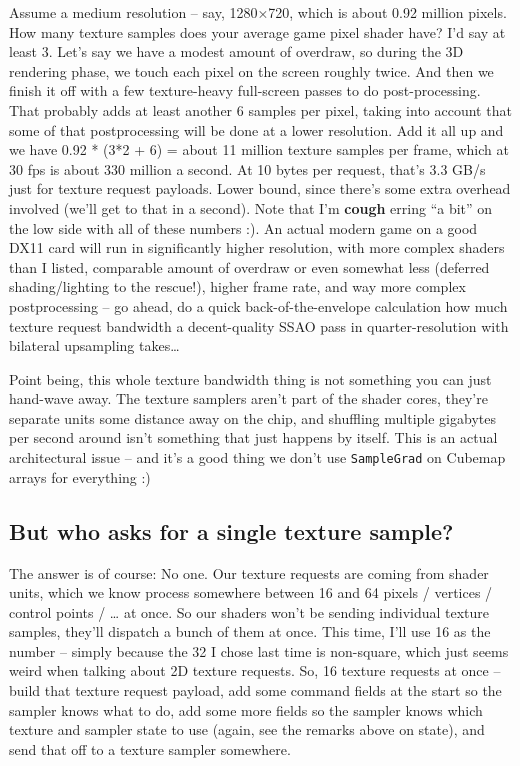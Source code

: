 \documentclass[12pt]{article}
\begin{document}
Assume a medium resolution – say, 1280×720, which is about 0.92 million pixels. How many texture samples does your average game pixel shader have? I’d say at least 3. Let’s say we have a modest amount of overdraw, so during the 3D rendering phase, we touch each pixel on the screen roughly twice. And then we finish it off with a few texture-heavy full-screen passes to do post-processing. That probably adds at least another 6 samples per pixel, taking into account that some of that postprocessing will be done at a lower resolution. Add it all up and we have 0.92 * (3*2 + 6) = about 11 million texture samples per frame, which at 30 fps is about 330 million a second. At 10 bytes per request, that’s 3.3 GB/s just for texture request payloads. Lower bound, since there’s some extra overhead involved (we’ll get to that in a second). Note that I’m \textbf{cough} erring “a bit” on the low side with all of these numbers :). An actual modern game on a good DX11 card will run in significantly higher resolution, with more complex shaders than I listed, comparable amount of overdraw or even somewhat less (deferred shading/lighting to the rescue!), higher frame rate, and way more complex postprocessing – go ahead, do a quick back-of-the-envelope calculation how much texture request bandwidth a decent-quality SSAO pass in quarter-resolution with bilateral upsampling takes…

Point being, this whole texture bandwidth thing is not something you can just hand-wave away. The texture samplers aren’t part of the shader cores, they’re separate units some distance away on the chip, and shuffling multiple gigabytes per second around isn’t something that just happens by itself. This is an actual architectural issue – and it’s a good thing we don’t use \texttt{SampleGrad} on Cubemap arrays for everything :)

\subsection{But who asks for a single texture sample?}
\label{sec:org858e2d6}

The answer is of course: No one. Our texture requests are coming from shader units, which we know process somewhere between 16 and 64 pixels / vertices / control points / … at once. So our shaders won’t be sending individual texture samples, they’ll dispatch a bunch of them at once. This time, I’ll use 16 as the number – simply because the 32 I chose last time is non-square, which just seems weird when talking about 2D texture requests. So, 16 texture requests at once – build that texture request payload, add some command fields at the start so the sampler knows what to do, add some more fields so the sampler knows which texture and sampler state to use (again, see the remarks above on state), and send that off to a texture sampler somewhere.
\end{document}
